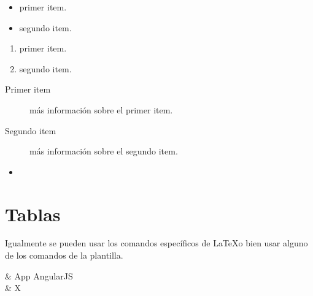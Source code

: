 \begin{itemize}
	\item primer item.
	\item segundo item.
\end{itemize}

\begin{enumerate}
	\item primer item.
	\item segundo item.
\end{enumerate}

\begin{description}
	\item[Primer item] más información sobre el primer item.
	\item[Segundo item] más información sobre el segundo item.
\end{description}
	
\begin{itemize}
\item 
\end{itemize}

\section{Tablas}

Igualmente se pueden usar los comandos específicos de \LaTeX o bien usar alguno de los comandos de la plantilla.

{  & App AngularJS  \\}{ 
 & X \\
} 

